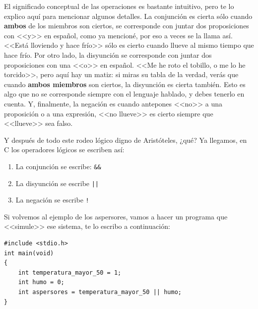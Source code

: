 \documentclass[a4paper]{article}
\begin{document}
El significado conceptual de las operaciones es bastante intuitivo, pero te lo
explico aquí para mencionar algunos detalles. La conjunción es cierta sólo
cuando \textbf{ambos} de los miembros son ciertos, se corresponde con juntar
dos proposiciones con <<y>> en español, como ya mencioné, por eso a veces se la
llama así. <<Está lloviendo y hace frío>> sólo es cierto cuando llueve al mismo
tiempo que hace frío. Por otro lado, la disyunción se corresponde con juntar
dos proposiciones con una <<o>> en español. <<Me he roto el tobillo, o me lo
he torcido>>, pero aquí hay un matiz: si miras su tabla de la verdad, verás que
cuando \textbf{ambos miembros} son ciertos, la disyunción es cierta también.
Esto es algo que no se corresponde siempre con el lenguaje hablado, y debes
tenerlo en cuenta. Y, finalmente, la negación es cuando antepones <<no>> a una
proposición o a una expresión, <<no llueve>> es cierto siempre que <<llueve>>
sea falso.

Y después de todo este rodeo lógico digno de Aristóteles, ¿qué? Ya llegamos,
en C los operadores lógicos se escriben así:
\begin{enumerate}
\item La conjunción se escribe: \verb!&&!
\item La disyunción se escribe \verb!||!
\item La negación se escribe \verb"!"
\end{enumerate}

Si volvemos al ejemplo de los aspersores, vamos a hacer un programa que
<<simule>> ese sistema, te lo escribo a continuación:


\noindent
\begin{minipage}[H]{\linewidth}
\mbox{}
\begin{lstlisting}[style=C,
caption={Primer programa con operacioneslógicas},
label={lst:firstLogicProgram}]
#include <stdio.h>
int main(void)
{
    int temperatura_mayor_50 = 1;
    int humo = 0;
    int aspersores = temperatura_mayor_50 || humo;
}
\end{lstlisting}
\end{minipage}
\end{document}
